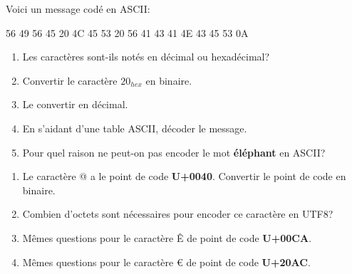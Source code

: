 \documentclass[a4paper,11pt]{article}
\begin{document}
\begin{exo}
    Voici un message codé en ASCII:
    \begin{center}
        56 49 56 45 20 4C 45 53 20 56 41 43 41 4E 43 45 53 0A
    \end{center}
    \begin{enumerate}
        \item Les caractères sont-ils notés en décimal ou hexadécimal?
        \item Convertir le caractère $20_{hex}$ en binaire.
        \item Le convertir en décimal.
        \item En s'aidant d'une table ASCII, décoder le message.
        \item Pour quel raison ne peut-on pas encoder le mot \textbf{éléphant} en ASCII?
    \end{enumerate}
\end{exo}
\begin{exo}
    \begin{enumerate}
        \item Le caractère @ a le point de code \textbf{U+0040}. Convertir le point de code en binaire.
        \item Combien d'octets sont nécessaires pour encoder ce caractère en UTF8?
        \item Mêmes questions pour le caractère Ê de point de code \textbf{U+00CA}.
        \item Mêmes questions pour le caractère € de point de code \textbf{U+20AC}.

    \end{enumerate}
\end{exo}
\end{document}
